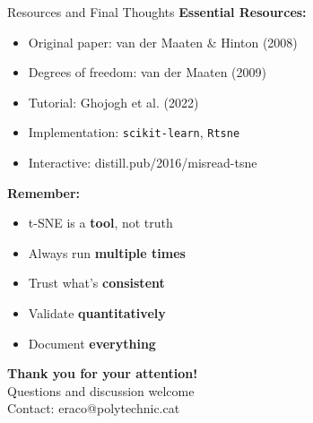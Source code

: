 \begin{frame}{Resources and Final Thoughts}
\textbf{Essential Resources:}
\begin{itemize}
\item Original paper: van der Maaten \& Hinton (2008)
\item Degrees of freedom: van der Maaten (2009)
\item Tutorial: Ghojogh et al. (2022)
\item Implementation: \texttt{scikit-learn}, \texttt{Rtsne}
\item Interactive: distill.pub/2016/misread-tsne
\end{itemize}

\textbf{Remember:}
\begin{itemize}
\item t-SNE is a \textbf{tool}, not truth
\item Always run \textbf{multiple times}
\item Trust what's \textbf{consistent}
\item Validate \textbf{quantitatively}
\item Document \textbf{everything}
\end{itemize}

\vspace{0.5cm}
\begin{center}
\Large\textbf{Thank you for your attention!}\\[0.3cm]
\normalsize Questions and discussion welcome\\[0.2cm]
\small Contact: eraco@polytechnic.cat
\end{center}
\end{frame}